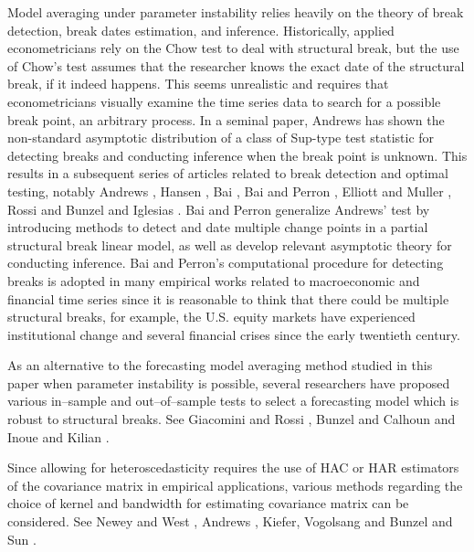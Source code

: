 Model averaging under parameter instability relies heavily on the theory of break detection, break dates estimation, and inference. Historically, applied econometricians rely on the Chow test to deal with structural break, but the use of Chow's test assumes that the researcher knows the exact date of the structural break, if it indeed happens. This seems unrealistic and requires that econometricians visually examine the time series data to search for a possible break point, an arbitrary process. In a seminal paper, Andrews \cite{andrews93} has shown the non-standard asymptotic distribution of a class of Sup-type test statistic for detecting breaks and conducting inference when the break point is unknown. This results in a subsequent series of articles related to break detection and optimal testing, notably Andrews \cite{andrews_ploberger94} \cite{andrews2003}, Hansen \cite{hansen_JE2000}, Bai \cite{bai_ET1997} \cite{bai_JE1999}, Bai and Perron \cite{bai_perron98}, Elliott and Muller \cite{elliott_muller_RES2006}, Rossi \cite{rossi_ET2005} and Bunzel and Iglesias \cite{bunzel_iglesias}. Bai and Perron \cite{bai_perron98} generalize Andrews' test by introducing methods to detect and date multiple change points in a partial structural break linear model, as well as develop relevant asymptotic theory for conducting inference. Bai and Perron's computational procedure for detecting breaks is adopted in many empirical works related to macroeconomic and financial time series since it is reasonable to think that there could be multiple structural breaks, for example, the U.S. equity markets have experienced institutional change and several financial crises since the early twentieth century.

As an alternative to the forecasting model averaging method studied in this paper when parameter instability is possible, several researchers have proposed various in--sample and out--of--sample tests to select a forecasting model which is robust to structural breaks. See Giacomini and Rossi \cite{giacomini_rossi_2008} \cite{giacomini_rossi_2010}, Bunzel and Calhoun \cite{bunzel_calhoun_2012} and Inoue and Kilian \cite{inoue_kilian_ER2004}.

Since allowing for heteroscedasticity requires the use of HAC or HAR estimators of the covariance matrix in empirical applications, various methods regarding the choice of kernel and bandwidth for estimating covariance matrix can be considered. See Newey and West \cite{newey_west_EMETRICA1987}, Andrews \cite{andrews91}, Kiefer, Vogolsang and Bunzel \cite{kvb2000} and Sun \cite{sunyixiao_2010}. 